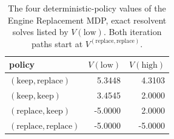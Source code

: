 \begin{table}[h]
\centering
\caption{The four deterministic-policy values of the Engine Replacement MDP, exact resolvent solves listed by $V(\text{low})$. Both iteration paths start at $V^{(\text{replace}, \text{replace})}$.}
\label{tab:engine_value_polytope}
\begin{tabular}{lrr}
\hline
policy & $V(\text{low})$ & $V(\text{high})$ \\
\hline
$(\text{keep}, \text{replace})$ & 5.3448 & 4.3103 \\
$(\text{keep}, \text{keep})$ & 3.4545 & 2.0000 \\
$(\text{replace}, \text{keep})$ & -5.0000 & 2.0000 \\
$(\text{replace}, \text{replace})$ & -5.0000 & -5.0000 \\
\hline
\end{tabular}
\end{table}
